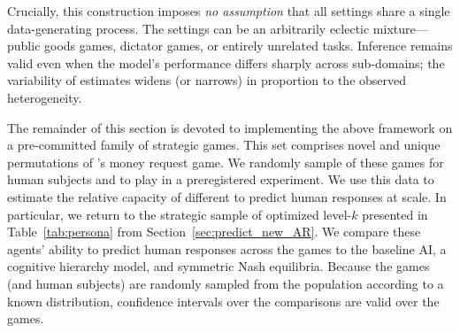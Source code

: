 Crucially, this construction imposes \emph{no assumption} that all settings share a single data-generating process.
The settings can be an arbitrarily eclectic mixture---public goods games, dictator games, or entirely unrelated tasks.   
Inference remains valid even when the model's performance differs sharply across sub-domains; the variability of estimates widens (or narrows) in proportion to the observed heterogeneity.

The remainder of this section is devoted to implementing the above framework on a pre-committed family of strategic games.
This set comprises \TotalGames{} novel and unique permutations of \citeauthor{1120Arad2012}'s money request game.
We randomly sample \NGamesS{} of these games for human subjects and  to play in a preregistered experiment.
We use this data to estimate the relative capacity of different  to predict human responses at scale.
In particular, we return to the strategic sample of optimized level-$k$  presented in Table~\ref{tab:persona} from Section~\ref{sec:predict_new_AR}.
We compare these agents' ability to predict human responses across the \NGamesS{} games to the baseline AI, a cognitive hierarchy model, and symmetric Nash equilibria.
Because the games (and human subjects) are randomly sampled from the population according to a known distribution, confidence intervals over the comparisons are valid over the \TotalGames{} games.
